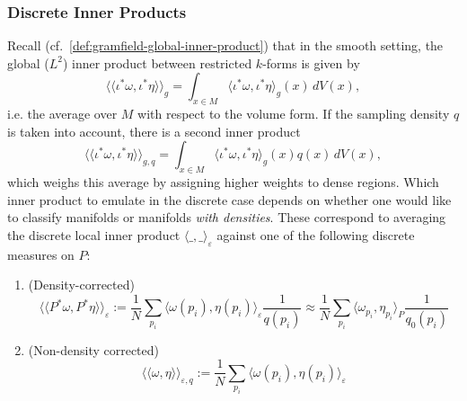 \documentclass{article}
\newcommand{\jake}[1]{}
\let\todo\undefined
\let\todo\undefined
\newcommand{\todo}[1][]{}
\theoremstyle{remark}
\theoremstyle{plain}
\begin{document}

\subsubsection{Discrete Inner Products}
\label{subsubsec:discrete-global-inner-product}



Recall (cf.~\eqref{def:gramfield-global-inner-product}) that in the smooth setting, the global (\( L^2 \)) inner product between restricted \( k \)-forms is given by $$\langle \! \langle \iota ^*\omega,  \iota^* \eta \rangle \! \rangle_{g}=\int_{x \in M} \langle \iota^* \omega,  \iota^* \eta \rangle_{g}(x) \, dV(x) , $$
i.e. the average over $M$ with respect to the volume form. If the sampling density $q$ is taken into account, there is a second inner product $$\langle \! \langle \iota ^* \omega , \iota^*\eta \rangle \! \rangle_{g, q}= \int_{x \in M} \langle \iota^*\omega, \iota^*\eta \rangle_{g}(x) q(x)\, dV(x),  $$
which weighs this average by assigning higher weights to dense regions. Which inner product to emulate in the discrete case depends on whether one would like to classify manifolds or manifolds \textit{with densities}. These correspond to averaging the discrete local inner product $\langle \_, \_ \rangle_{\varepsilon}$ against one of the following discrete measures on $P$:
\begin{enumerate}
    \item (Density-corrected) 
 \begin{equation}
        \langle \! \langle P^*\omega,P^* \eta \rangle \! \rangle_{\varepsilon} := \dfrac{1}{N}\sum_{p_i} \langle \omega ({p_i}), \eta({p_i})\rangle_{\varepsilon} \dfrac{1}{q(p_i)} { \approx \dfrac{1}{N}\sum_{p_i} \langle \omega_{p_i}, \eta_{p_i}\rangle_P \dfrac{1}{q_0(p_i)}}
    \end{equation}
    \item (Non-density corrected)
    \begin{equation}
        \langle \! \langle \omega, \eta \rangle \! \rangle_{\varepsilon,q}:= \dfrac{1}{N}\sum_{p_i} \langle \omega({p_i}), \eta({p_i})\rangle_{\varepsilon}
    \end{equation}
\end{enumerate}
\end{document}
